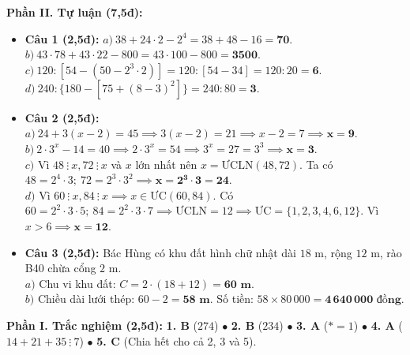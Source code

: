 \documentclass[11pt,a4paper]{article}
\newcommand{\customSubSection}[1]{%
  \vspace{1.2mm}%
  \noindent{\color{brandcyan}\bfseries\normalsize $\blacktriangleright$ #1}\par\vspace{0.4mm}%
}
\begin{document}
\textbf{Phần II. Tự luận (7,5đ):}
\begin{itemize}[leftmargin=1.3em, itemsep=1.2pt]
  \item \textbf{Câu 1 (2,5đ):}
    $a) \ 38 + 24 \cdot 2 - 2^4 = 38 + 48 - 16 = \mathbf{70}$. \quad
    $b) \ 43 \cdot 78 + 43 \cdot 22 - 800 = 43 \cdot 100 - 800 = \mathbf{3500}$.\\
    $c) \ 120 : [54 - (50 - 2^3 \cdot 2)] = 120 : [54 - 34] = 120 : 20 = \mathbf{6}$. \quad
    $d) \ 240 : \{180 - [75 + (8 - 3)^2]\} = 240 : 80 = \mathbf{3}$.
  \item \textbf{Câu 2 (2,5đ):}
    $a) \ 24 + 3(x - 2) = 45 \implies 3(x - 2) = 21 \implies x - 2 = 7 \implies \mathbf{x = 9}$.\\
    $b) \ 2 \cdot 3^x - 14 = 40 \implies 2 \cdot 3^x = 54 \implies 3^x = 27 = 3^3 \implies \mathbf{x = 3}$.\\
    $c)$ Vì $48 \ \vdots \ x, 72 \ \vdots \ x$ và $x$ lớn nhất nên $x = \text{ƯCLN}(48, 72)$. Ta có $48 = 2^4 \cdot 3; \ 72 = 2^3 \cdot 3^2 \implies \mathbf{x = 2^3 \cdot 3 = 24}$.\\
    $d)$ Vì $60 \ \vdots \ x, 84 \ \vdots \ x \implies x \in \text{ƯC}(60, 84)$. Có $60 = 2^2 \cdot 3 \cdot 5; \ 84 = 2^2 \cdot 3 \cdot 7 \implies \text{ƯCLN} = 12 \implies \text{ƯC} = \{1, 2, 3, 4, 6, 12\}$. Vì $x > 6 \implies \mathbf{x = 12}$.
  \item \textbf{Câu 3 (2,5đ):} Bác Hùng có khu đất hình chữ nhật dài $18\text{ m}$, rộng $12\text{ m}$, rào B40 chừa cổng $2\text{ m}$.\\
    $a)$ Chu vi khu đất: $C = 2 \cdot (18 + 12) = \mathbf{60\text{ m}}$.\\
    $b)$ Chiều dài lưới thép: $60 - 2 = \mathbf{58\text{ m}}$. Số tiền: $58 \times 80\,000 = \mathbf{4\,640\,000\text{ đồng}}$.
\end{itemize}

\vspace{1mm}

\customSubSection{2. Chi tiết Mã đề 102}
\textbf{Phần I. Trắc nghiệm (2,5đ):}
\textbf{1. B} ($274$) \quad $\bullet$ \quad
\textbf{2. B} ($234$) \quad $\bullet$ \quad
\textbf{3. A} ($* = 1$) \quad $\bullet$ \quad
\textbf{4. A} ($14+21+35 \ \vdots \ 7$) \quad $\bullet$ \quad
\textbf{5. C} (Chia hết cho cả 2, 3 và 5).
\end{document}
